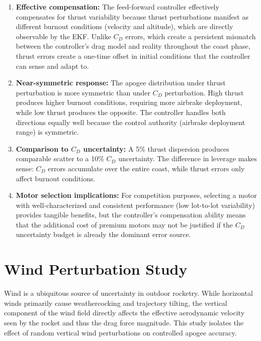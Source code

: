 \documentclass[11pt,letterpaper]{article}
\newcommand{\Cd}{C_D}
\begin{document}
\begin{enumerate}[nosep]
    \item \textbf{Effective compensation:} The feed-forward controller effectively compensates for thrust variability because thrust perturbations manifest as different burnout conditions (velocity and altitude), which are directly observable by the EKF. Unlike $\Cd$ errors, which create a persistent mismatch between the controller's drag model and reality throughout the coast phase, thrust errors create a one-time offset in initial conditions that the controller can sense and adapt to.

    \item \textbf{Near-symmetric response:} The apogee distribution under thrust perturbation is more symmetric than under $\Cd$ perturbation. High thrust produces higher burnout conditions, requiring more airbrake deployment, while low thrust produces the opposite. The controller handles both directions equally well because the control authority (airbrake deployment range) is symmetric.

    \item \textbf{Comparison to $\Cd$ uncertainty:} A 5\% thrust dispersion produces comparable scatter to a 10\% $\Cd$ uncertainty. The difference in leverage makes sense: $\Cd$ errors accumulate over the entire coast, while thrust errors only affect burnout conditions.

    \item \textbf{Motor selection implications:} For competition purposes, selecting a motor with well-characterized and consistent performance (low lot-to-lot variability) provides tangible benefits, but the controller's compensation ability means that the additional cost of premium motors may not be justified if the $\Cd$ uncertainty budget is already the dominant error source.
\end{enumerate}


\section{Wind Perturbation Study}
\label{sec:wind}

Wind is a ubiquitous source of uncertainty in outdoor rocketry. While horizontal winds primarily cause weathercocking and trajectory tilting, the vertical component of the wind field directly affects the effective aerodynamic velocity seen by the rocket and thus the drag force magnitude. This study isolates the effect of random vertical wind perturbations on controlled apogee accuracy.
\end{document}
